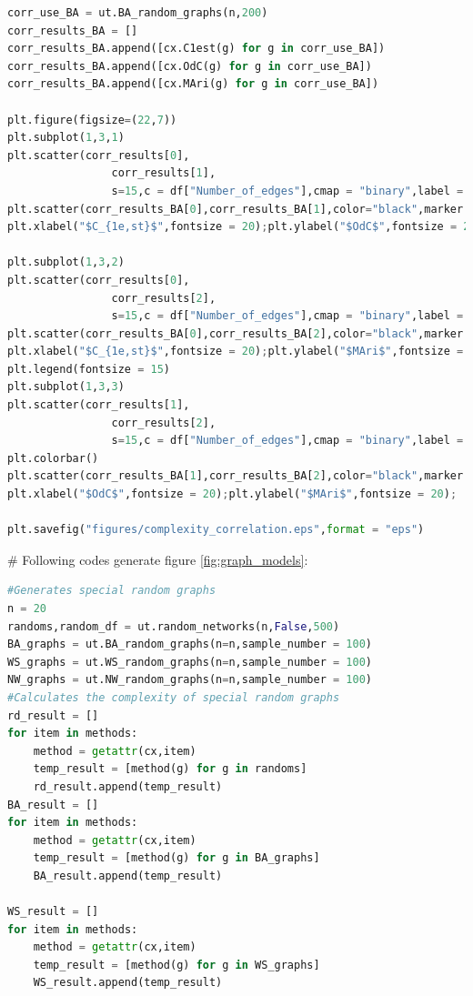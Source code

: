 \documentclass[12pt]{article}
\begin{document}
{\begin{lstlisting}[breaklines=true,language=Python]
corr_use_BA = ut.BA_random_graphs(n,200)
corr_results_BA = []
corr_results_BA.append([cx.C1est(g) for g in corr_use_BA])
corr_results_BA.append([cx.OdC(g) for g in corr_use_BA])
corr_results_BA.append([cx.MAri(g) for g in corr_use_BA])

plt.figure(figsize=(22,7))
plt.subplot(1,3,1)
plt.scatter(corr_results[0],
                corr_results[1],
                s=15,c = df["Number_of_edges"],cmap = "binary",label = "$G(n,m)$ random graphs")
plt.scatter(corr_results_BA[0],corr_results_BA[1],color="black",marker = "x",label = "BA Graphs")
plt.xlabel("$C_{1e,st}$",fontsize = 20);plt.ylabel("$OdC$",fontsize = 20);

plt.subplot(1,3,2)
plt.scatter(corr_results[0],
                corr_results[2],
                s=15,c = df["Number_of_edges"],cmap = "binary",label = "$G(n,m)$ random graphs")
plt.scatter(corr_results_BA[0],corr_results_BA[2],color="black",marker = "x",label = "BA Graphs")
plt.xlabel("$C_{1e,st}$",fontsize = 20);plt.ylabel("$MAri$",fontsize = 20);
plt.legend(fontsize = 15)
plt.subplot(1,3,3)
plt.scatter(corr_results[1],
                corr_results[2],
                s=15,c = df["Number_of_edges"],cmap = "binary",label = "$G(n,m)$ random graphs")
plt.colorbar()
plt.scatter(corr_results_BA[1],corr_results_BA[2],color="black",marker = "x",label = "BA Graphs")
plt.xlabel("$OdC$",fontsize = 20);plt.ylabel("$MAri$",fontsize = 20);

plt.savefig("figures/complexity_correlation.eps",format = "eps")
\end{lstlisting}
\noindent
\newline
\# Following codes generate figure \ref{fig:graph_models}:
\begin{lstlisting}[breaklines=true,language=Python]
#Generates special random graphs
n = 20
randoms,random_df = ut.random_networks(n,False,500)
BA_graphs = ut.BA_random_graphs(n=n,sample_number = 100)
WS_graphs = ut.WS_random_graphs(n=n,sample_number = 100)
NW_graphs = ut.NW_random_graphs(n=n,sample_number = 100)
#Calculates the complexity of special random graphs
rd_result = []
for item in methods:
    method = getattr(cx,item)
    temp_result = [method(g) for g in randoms]
    rd_result.append(temp_result)
BA_result = []
for item in methods:
    method = getattr(cx,item)
    temp_result = [method(g) for g in BA_graphs]
    BA_result.append(temp_result)

WS_result = []
for item in methods:
    method = getattr(cx,item)
    temp_result = [method(g) for g in WS_graphs]
    WS_result.append(temp_result)


\end{lstlisting}}
\end{document}
